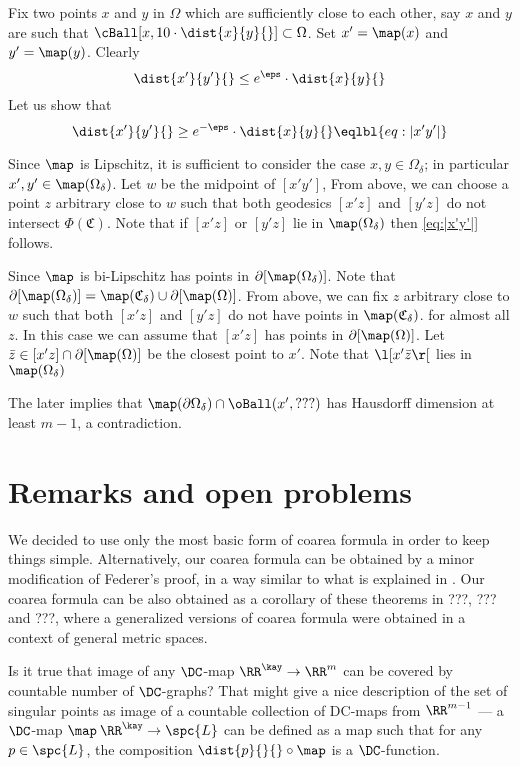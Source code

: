 Fix two points $x$ and $y$ in $\Omega$ which are sufficiently close to each other, 
say $x$ and $y$ 
are such that $\cBall[x,10\cdot\dist{x}{y}{}]\subset\Omega$.
Set $x'=\map(x)$ and $y'=\map(y)$.
Clearly 
\[\dist{x'}{y'}{}
\le
e^{\eps}\cdot\dist{x}{y}{}\]
Let us show that
\[\dist{x'}{y'}{}
\ge
e^{-\eps}\cdot\dist{x}{y}{}
\eqlbl{eq:|x'y'|}\]

Since $\map$ is Lipschitz, 
it is sufficient to consider the case $x,y\in \Omega_\delta$;
in particular $x',y'\in\map(\Omega_\delta)$.
Let $w$ be the midpoint of $[x'y']$,
From above, we can choose a point $z$ arbitrary close to $w$
such that both geodesics $[x'z]$ and $[y'z]$ do not intersect 
$\Phi(\mathfrak{C})$.
Note that if $[x'z]$ or $[y'z]$ lie in $\map(\Omega_\delta)$
then \ref{eq:|x'y'|} follows.

Since $\map$ is bi-Lipschitz 
has points in $\partial [\map(\Omega_\delta)]$.
Note that $\partial [\map(\Omega_\delta)]=\map(\mathfrak{C}_\delta)\cup\partial[\map(\Omega)]$.
From above, we can fix $z$ arbitrary close to $w$
such that both $[x'z]$ and $[y'z]$
do not have points in $\map(\mathfrak{C}_\delta)$.
for almost all $z$.
In this case we can assume that $[x'z]$ has points in $\partial[\map(\Omega)]$.
Let $\bar z\in [x'z]\cap\partial[\map(\Omega)]$ be the closest point to $x'$.
Note that $\l[x'\bar z\r[$ lies in $\map(\Omega_\delta)$


The later implies that $\map(\partial \Omega_\delta)\cap \oBall(x',???)$ has Hausdorff dimension at least $m-1$,
a contradiction.
\qeds



\section{Remarks and open problems}

We decided to use only the most basic form of coarea formula
in order to keep things simple.
Alternatively, our coarea formula can be obtained
by a minor modification of Federer's proof,
in a way similar to what is explained in \cite[3.2.46]{federer}.
Our coarea formula can be also obtained as a corollary of these theorems in ???, ??? and ???, where a generalized versions of coarea formula were obtained in a context of general metric spaces.

Is it true that image of any $\DC$-map $\RR^\kay\to\RR^m$ can be covered by countable number of $\DC$-graphs? 
That might give a nice description of the set of singular points as image of a countable collection of DC-maps from $\RR^{m-1}$ --- a $\DC$-map $\map\:\RR^\kay\to\spc{L}$ can be defined as a map such that for any $p\in\spc{L}$, the composition $\dist{p}{}{}\circ\map$ is a $\DC$-function.

